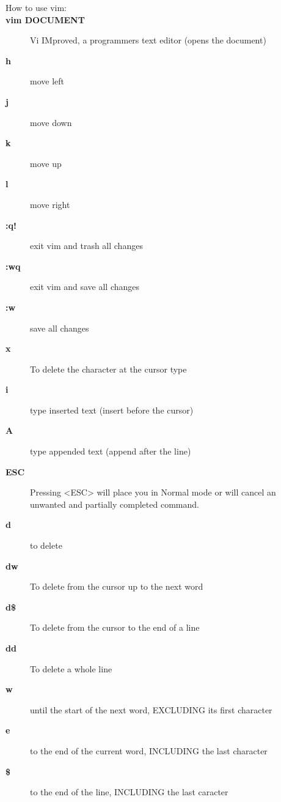 \documentclass[10pt,a4paper]{scrartcl}
\begin{document}
\begin{description}
\item[\large{How to use vim:}]

\item[\bf{vim DOCUMENT}] Vi IMproved, a programmers text editor (opens the document)

\item[\bf{h}] move left

\item[\bf{j}] move down

\item[\bf{k}] move up

\item[\bf{l}] move right

\item[\bf{:q!}] exit vim and trash all changes

\item[\bf{:wq}] exit vim and save all changes

\item[\bf{:w}] save all changes

\item[\bf{x}] To delete the character at the cursor type

\item[\bf{i}] type inserted text (insert before the cursor)

\item[\bf{A}] type appended text (append after the line)

\item[\bf{ESC}]  Pressing <ESC> will place you in Normal mode or will cancel
      an unwanted and partially completed command.

\item[\bf{d}] to delete

\item[\bf{dw}] To delete from the cursor up to the next word

\item[\bf{d\$}] To delete from the cursor to the end of a line

\item[\bf{dd}] To delete a whole line

\item[\bf{w}] until the start of the next word, EXCLUDING its first character

\item[\bf{e}] to the end of the current word, INCLUDING the last character

\item[\bf{\$}] to the end of the line, INCLUDING the last caracter


\end{description}
\end{document}
